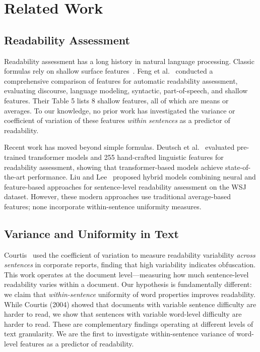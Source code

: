\documentclass[11pt,letterpaper]{article}
\begin{document}
\section{Related Work}

\subsection{Readability Assessment}

Readability assessment has a long history in natural language processing. Classic formulas rely on shallow surface features~\cite{Flesch1948, Kincaid1975}. Feng et al.~\cite{Feng2010} conducted a comprehensive comparison of features for automatic readability assessment, evaluating discourse, language modeling, syntactic, part-of-speech, and shallow features. Their Table 5 lists 8 shallow features, all of which are means or averages. To our knowledge, no prior work has investigated the variance or coefficient of variation of these features \textit{within sentences} as a predictor of readability.

Recent work has moved beyond simple formulas. Deutsch et al.~\cite{Deutsch2020} evaluated pre-trained transformer models and 255 hand-crafted linguistic features for readability assessment, showing that transformer-based models achieve state-of-the-art performance. Liu and Lee~\cite{Liu2023} proposed hybrid models combining neural and feature-based approaches for sentence-level readability assessment on the WSJ dataset. However, these modern approaches use traditional average-based features; none incorporate within-sentence uniformity measures.

\subsection{Variance and Uniformity in Text}

Courtis~\cite{Courtis2004} used the coefficient of variation to measure readability variability \textit{across sentences} in corporate reports, finding that high variability indicates obfuscation. This work operates at the document level---measuring how much sentence-level readability varies within a document. Our hypothesis is fundamentally different: we claim that \textit{within-sentence} uniformity of word properties improves readability. While Courtis (2004) showed that documents with variable sentence difficulty are harder to read, we show that sentences with variable word-level difficulty are harder to read. These are complementary findings operating at different levels of text granularity. We are the first to investigate within-sentence variance of word-level features as a predictor of readability.
\end{document}
